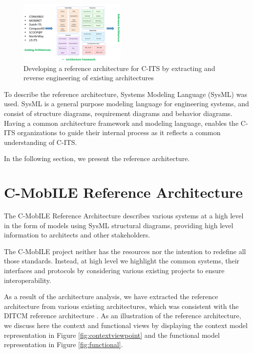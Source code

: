 \documentclass[conference]{IEEEtran}
\begin{document}
\begin{figure}[ht!]
	\centering
	\includegraphics[width=0.47\textwidth]{methodology}
	\caption{Developing a reference architecture for C-ITS by extracting and reverse engineering of existing architectures}
	\label{methodology}
	\centering
\end{figure}

To describe the reference architecture, Systems Modeling Language (SysML) was used. SysML is a general purpose modeling language for engineering systems, and consist of structure diagrams, requirement diagrams and behavior diagrams. Having a common architecture framework and modeling language, enables the C-ITS organizations to guide their internal process as it reflects a common understanding of C-ITS.

In the following section, we present the reference architecture.

\section{C-MobILE Reference Architecture}
\label{secCMobILEReferenceArchitecture}

The C-MobILE Reference Architecture describes various systems at a high level in the form of models using SysML structural diagrams, providing high level information to architects and other stakeholders.

The C-MobILE project neither has the resources nor the intention to redefine all those standards.
Instead, at high level we highlight the common systems, their interfaces and protocols by considering various existing projects to ensure interoperability.

As a result of the architecture analysis, we have extracted the reference architecture from various existing architectures, which was consistent with the DITCM reference architecture \cite{ditcm}\cite{ditcmits}. As an illustration of the reference architecture, we discuss here the context and functional views by displaying the context model representation in Figure \ref{fig:contextviewpoint} and the functional model representation in Figure \ref{fig:functional}. 
\end{document}
